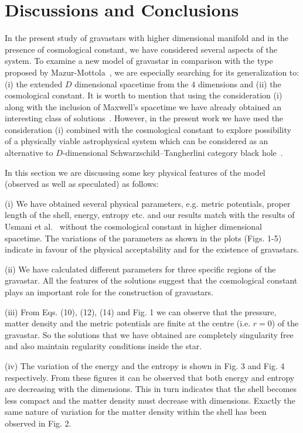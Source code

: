\documentclass[preprint,12pt]{elsarticle}
\begin{document}
\section{Discussions and Conclusions}
In the present study of gravastars with higher dimensional manifold and in the presence of
cosmological constant, we have considered several aspects of the system. To examine a new
model of gravastar in comparison with the type proposed by Mazur-Mottola~\cite{Mazur2001,Mazur2004},
we are especially searching for its generalization to: (i) the extended $D$
dimensional spacetime from the $4$ dimensions and (ii) the cosmological constant.
It is worth to mention that using the consideration (i) along with the inclusion of Maxwell's spacetime we have
already obtained an interesting class of solutions~\cite{Ghosh2017}. However, in the present work
we have used the consideration (i) combined with the cosmological constant  to explore possibility of a physically viable astrophysical system
which can be considered as an alternative to $D$-dimensional Schwarzschild–Tangherlini
category black hole~\cite{Tangherlini1963}.

In this section we are discussing some key physical features of the model (observed as well as speculated) as follows:

(i) We have obtained several physical parameters, e.g. metric potentials,
proper length of the shell, energy, entropy etc. and our results match
with the results of Usmani et al.~\cite{Usmani2011} without the cosmological
constant in higher dimensional spacetime. The variations of the parameters as
shown in the plots (Figs. 1-5) indicate in favour of the physical acceptability
and for the existence of gravastars.

(ii) We have calculated different parameters for three specific
regions of the gravastar. All the features of the solutions suggest
that the cosmological constant plays an important role for the
construction of gravastars.

(iii) From Eqs. (10), (12), (14) and Fig. 1  we can observe that the pressure,
 matter density and the metric potentials  are finite at the centre
 (i.e. $r=0$) of the gravastar. So the solutions that we have obtained
 are completely singularity free and also maintain regularity conditions
 inside the star.

(iv) The variation of the energy and the entropy is shown in Fig. 3 and
Fig. 4 respectively. From these figures it can be observed that both energy
and entropy are decreasing with the dimensions. This in turn indicates that
the shell becomes less compact and the matter density must decrease with
dimensions. Exactly the same nature of variation for the matter density
within the shell has been observed in Fig. 2.
\end{document}
